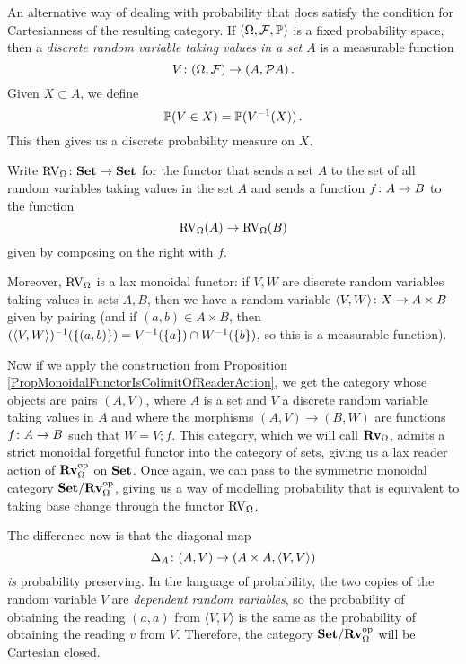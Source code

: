\documentclass{article}
\begin{document}
\begin{example}
  An alternative way of dealing with probability that does satisfy the condition for Cartesianness of the resulting category.
  If $(\Omega,\mathcal F,\mathbb{P})$ is a fixed probability space, then a \emph{discrete random variable taking values in a set $A$} is a measurable function
  \[
    V\colon (\Omega,\mathcal F) \to (A,\mathcal P A)\,.
    \]
  Given $X \subset A$, we define
  \[
    \mathbb{P}(V \in X) = \mathbb{P}(V^{-1}(X))\,.
    \]
  This then gives us a discrete probability measure on $X$.

  Write $\operatorname{RV}_\Omega \colon {\normalfont\textbf{Set}} \to {\normalfont\textbf{Set}}$ for the functor that sends a set $A$ to the set of all random variables taking values in the set $A$ and sends a function $f\colon A \to B$ to the function
  \[
    \operatorname{RV}_\Omega(A) \to \operatorname{RV}_\Omega(B)
    \]
  given by composing on the right with $f$.

  Moreover, $\operatorname{RV}_\Omega$ is a lax monoidal functor: if $V,W$ are discrete random variables taking values in sets $A,B$, then we have a random variable $\langle V,W \rangle\colon X \to A\times B$ given by pairing (and if $(a,b)\in A\times B$, then $(\langle V,W\rangle)^{-1}(\{(a,b)\}) = V^{-1}(\{a\})\cap W^{-1}(\{b\})$, so this is a measurable function).  

  Now if we apply the construction from Proposition \ref{PropMonoidalFunctorIsColimitOfReaderAction}, we get the category whose objects are pairs $(A,V)$, where $A$ is a set and $V$ a discrete random variable taking values in $A$ and where the morphisms $(A,V) \to (B,W)$ are functions $f \colon A \to B$ such that $W=V;f$.
  This category, which we will call ${\normalfont\textbf{Rv}}_\Omega$, admits a strict monoidal forgetful functor into the category of sets, giving us a lax reader action of ${\normalfont\textbf{Rv}}_\Omega^{\mathrm{op}}$ on ${\normalfont\textbf{Set}}$.
  Once again, we can pass to the symmetric monoidal category ${\normalfont\textbf{Set}}/{\normalfont\textbf{Rv}}_\Omega^{\mathrm{op}}$, giving us a way of modelling probability that is equivalent to taking base change through the functor $\operatorname{RV}_\Omega$.

  The difference now is that the diagonal map
  \[
    \Delta_A \colon (A,V) \to (A\times A, \langle V,V\rangle)
    \]
  \emph{is} probability preserving.  
  In the language of probability, the two copies of the random variable $V$ are \emph{dependent random variables}, so the probability of obtaining the reading $(a,a)$ from $\langle V,V\rangle$ is the same as the probability of obtaining the reading $v$ from $V$.
  Therefore, the category ${\normalfont\textbf{Set}}/{\normalfont\textbf{Rv}}_\Omega^{\mathrm{op}}$ will be Cartesian closed.
\end{example}
\end{document}
